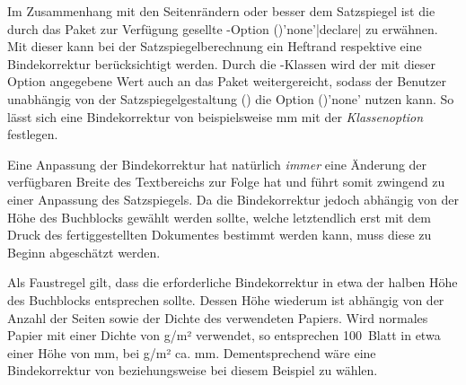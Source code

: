 \begin{Declaration*}{}
\begin{Declaration*}{}
\begin{Declaration*}{}
%
%
Im Zusammenhang mit den Seitenrändern oder besser dem Satzspiegel ist die durch 
das Paket  zur Verfügung gesellte \KOMAScript-Option 
()'none'|declare| zu 
erwähnen. Mit dieser kann bei der Satzspiegelberechnung ein Heftrand respektive 
eine Bindekorrektur berücksichtigt werden. Durch die \TUDScript-Klassen wird 
der mit dieser Option angegebene Wert auch an das Paket  
weitergereicht, sodass der Benutzer unabhängig von der Satzspiegelgestaltung 
() die Option ()'none' nutzen 
kann. So lässt sich eine Bindekorrektur von beispielsweise \unit[5]{mm} mit der 
\emph{Klassenoption}  festlegen.

Eine Anpassung der Bindekorrektur hat natürlich \emph{immer} eine Änderung der 
verfügbaren Breite des Textbereichs zur Folge hat und führt somit zwingend zu 
einer Anpassung des Satzspiegels. Da die Bindekorrektur jedoch abhängig von der 
Höhe des Buchblocks gewählt werden sollte, welche letztendlich erst mit dem 
Druck des fertiggestellten Dokumentes bestimmt werden kann, muss diese zu 
Beginn abgeschätzt werden.
%
\begin{Example}
Als Faustregel gilt, dass die erforderliche Bindekorrektur in etwa der halben 
Höhe des Buchblocks entsprechen sollte. Dessen Höhe wiederum ist abhängig von 
der Anzahl der Seiten sowie der Dichte des verwendeten Papiers. Wird normales 
Papier mit einer Dichte von \unit[80]{g/m²} verwendet, so entsprechen 100~Blatt 
in etwa einer Höhe von \unit[10]{mm}, bei \unit[100]{g/m²} ca. \unit[12]{mm}. 
Dementsprechend wäre eine Bindekorrektur von  beziehungsweise 
 bei diesem Beispiel zu wählen.
%
\end{Example}



\end{Declaration*}
\end{Declaration*}
\end{Declaration*}
